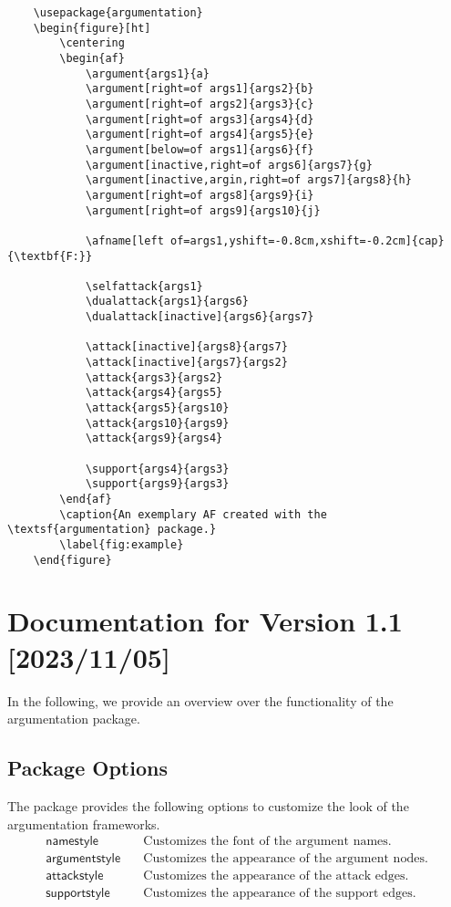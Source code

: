 \documentclass{article}
\begin{document}
\begin{verbatim}
    \usepackage{argumentation}
    \begin{figure}[ht]
        \centering
        \begin{af}
            \argument{args1}{a}
            \argument[right=of args1]{args2}{b}
            \argument[right=of args2]{args3}{c}
            \argument[right=of args3]{args4}{d}
            \argument[right=of args4]{args5}{e}
            \argument[below=of args1]{args6}{f}
            \argument[inactive,right=of args6]{args7}{g}
            \argument[inactive,argin,right=of args7]{args8}{h}
            \argument[right=of args8]{args9}{i}
            \argument[right=of args9]{args10}{j}
    
            \afname[left of=args1,yshift=-0.8cm,xshift=-0.2cm]{cap}{\textbf{F:}}
    
            \selfattack{args1}
            \dualattack{args1}{args6}
            \dualattack[inactive]{args6}{args7}
            
            \attack[inactive]{args8}{args7}
            \attack[inactive]{args7}{args2}
            \attack{args3}{args2}    
            \attack{args4}{args5}
            \attack{args5}{args10}
            \attack{args10}{args9}
            \attack{args9}{args4}

            \support{args4}{args3}
            \support{args9}{args3}
        \end{af}
        \caption{An exemplary AF created with the \textsf{argumentation} package.}
        \label{fig:example}
    \end{figure}
\end{verbatim}

\section{Documentation for Version 1.1 [2023/11/05]}
In the following, we provide an overview over the functionality of the \textsf{argumentation} package.

\subsection{Package Options}
    The package provides the following options to customize the look of the argumentation frameworks.
    \begin{align*}
        \mathsf{namestyle} &\quad \text{Customizes the font of the argument names.}\\
        \mathsf{argumentstyle} &\quad \text{Customizes the appearance of the argument nodes.}\\
        \mathsf{attackstyle} &\quad \text{Customizes the appearance of the attack edges.}\\
        \mathsf{supportstyle} &\quad \text{Customizes the appearance of the support edges.}\\
    \end{align*}
\end{document}
